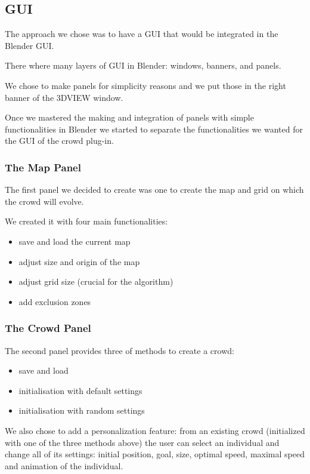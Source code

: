 \subsection{GUI} 


The approach we chose was to have a GUI that would be integrated in
the Blender GUI.

There where many layers of GUI in Blender: windows, banners, and
panels.

We chose to make panels for simplicity reasons and we put those in the
right banner of the 3DVIEW window.

Once we mastered the making and integration of panels with simple
functionalities in Blender we started to separate the functionalities
we wanted for the GUI of the crowd plug-in.

\subsubsection{The Map Panel}


The first panel we decided to create was one to create the map and
grid on which the crowd will evolve.

We created it with four main functionalities:
\begin{itemize}
\item save and load the current map
\item adjust size and origin of the map
\item adjust grid size (crucial for the algorithm)
\item add exclusion zones
\end{itemize}


\subsubsection{The Crowd Panel} 

The second panel provides three of methods to create a crowd:
\begin{itemize}
\item save and load
\item initialisation with default settings
\item initialisation with random settings
\end{itemize}

We also chose to add a personalization feature: from an existing crowd
(initialized with one of the three methods above) the user can select
an individual and change all of its settings: initial position, goal,
size, optimal speed, maximal speed and animation of the individual.


